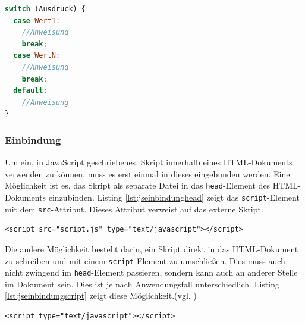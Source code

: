 \vspace{1em}
\begin{lstlisting}[language=JavaScript, caption=Syntax Switch-Anweisung, label=lst:jssyntaxswitch]
switch (Ausdruck) {
  case Wert1:
    //Anweisung
    break;
  case WertN:
    //Anweisung
    break;
  default:
    //Anweisung
}
\end{lstlisting}

\subsubsection{Einbindung} Um ein, in JavaScript geschriebenes, Skript innerhalb eines HTML-Dokuments verwenden zu können, muss es erst einmal in dieses eingebunden werden. Eine Möglichkeit ist es, das Skript als separate Datei in das \texttt{head}-Element des HTML-Dokuments einzubinden. Listing \ref{lst:jseinbindunghead} zeigt das \texttt{script}-Element mit dem \texttt{src}-Attribut. Dieses Attribut verweist auf das externe Skript.

\vspace{1em}
\begin{lstlisting}[language=HTML5, caption=JavaScript Einbindung als separate Datei im \texttt{head}-Element, label=lst:jseinbindunghead]
<script src="script.js" type="text/javascript"></script>
\end{lstlisting}

Die andere Möglichkeit besteht darin, ein Skript direkt in das HTML-Dokument zu schreiben und mit einem \texttt{script}-Element zu umschließen. Dies muss auch nicht zwingend im \texttt{head}-Element passieren, sondern kann auch an anderer Stelle im Dokument sein. Dies ist je nach Anwendungsfall unterschiedlich. Listing \ref{lst:jseinbindungscript} zeigt diese Möglichkeit.(vgl. \cite[S.47]{AntoEinf2014})

\vspace{1em}
\begin{lstlisting}[language=HTML5, caption=JavaScript Einbindung in \texttt{script}-Element, label=lst:jseinbindungscript]
<script type="text/javascript"></script>
\end{lstlisting}


